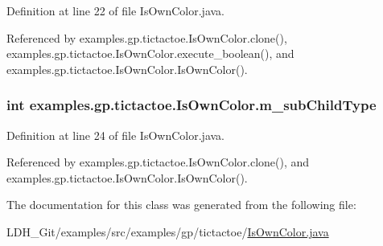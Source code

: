 Definition at line 22 of file Is\-Own\-Color.\-java.



Referenced by examples.\-gp.\-tictactoe.\-Is\-Own\-Color.\-clone(), examples.\-gp.\-tictactoe.\-Is\-Own\-Color.\-execute\-\_\-boolean(), and examples.\-gp.\-tictactoe.\-Is\-Own\-Color.\-Is\-Own\-Color().

\hypertarget{classexamples_1_1gp_1_1tictactoe_1_1_is_own_color_a75d57d0cacb2a9af720e2c63b1827f00}{
\subsubsection[{m\-\_\-sub\-Child\-Type}]{\setlength{\rightskip}{0pt plus 5cm}int examples.\-gp.\-tictactoe.\-Is\-Own\-Color.\-m\-\_\-sub\-Child\-Type\hspace{0.3cm}{\ttfamily [private]}}}\label{classexamples_1_1gp_1_1tictactoe_1_1_is_own_color_a75d57d0cacb2a9af720e2c63b1827f00}


Definition at line 24 of file Is\-Own\-Color.\-java.



Referenced by examples.\-gp.\-tictactoe.\-Is\-Own\-Color.\-clone(), and examples.\-gp.\-tictactoe.\-Is\-Own\-Color.\-Is\-Own\-Color().



The documentation for this class was generated from the following file\-:\begin{DoxyCompactItemize}
\item 
L\-D\-H\-\_\-\-Git/examples/src/examples/gp/tictactoe/\hyperlink{_is_own_color_8java}{Is\-Own\-Color.\-java}\end{DoxyCompactItemize}
